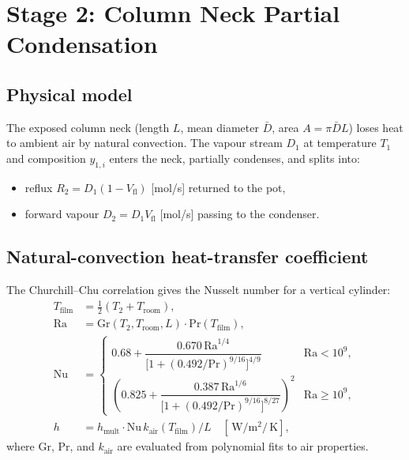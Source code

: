 \documentclass[11pt,letterpaper]{article}
\newcommand{\W}{\,\text{W}}
\newcommand{\K}{\,\text{K}}
\begin{document}
\section{Stage 2: Column Neck Partial Condensation}
\label{sec:stage2}

\subsection{Physical model}

The exposed column neck (length $L$, mean diameter $\bar{D}$, area $A = \pi \bar{D} L$)
loses heat to ambient air by natural convection.  The vapour stream $D_1$ at
temperature $T_1$ and composition $y_{1,i}$ enters the neck, partially
condenses, and splits into:
\begin{itemize}[nosep]
  \item reflux $R_2 = D_1(1-V_{\mathrm{fl}})$ [mol/s] returned to the pot,
  \item forward vapour $D_2 = D_1 V_{\mathrm{fl}}$ [mol/s] passing to the condenser.
\end{itemize}

\subsection{Natural-convection heat-transfer coefficient}

The Churchill--Chu correlation gives the Nusselt number for a vertical cylinder:
\begin{align}
  T_{\mathrm{film}} &= \tfrac{1}{2}(T_2 + T_{\mathrm{room}}),\\
  \mathrm{Ra} &= \mathrm{Gr}(T_2, T_{\mathrm{room}}, L) \cdot \mathrm{Pr}(T_{\mathrm{film}}),\\
  \mathrm{Nu} &= \begin{cases}
    0.68 + \dfrac{0.670\,\mathrm{Ra}^{1/4}}{\bigl[1+(0.492/\mathrm{Pr})^{9/16}\bigr]^{4/9}}
    & \mathrm{Ra} < 10^9,\\[8pt]
    \left(0.825 + \dfrac{0.387\,\mathrm{Ra}^{1/6}}{\bigl[1+(0.492/\mathrm{Pr})^{9/16}\bigr]^{8/27}}\right)^{\!2}
    & \mathrm{Ra} \ge 10^9,
  \end{cases}\\
  h &= h_{\mathrm{mult}} \cdot \mathrm{Nu}\, k_{\mathrm{air}}(T_{\mathrm{film}}) / L \quad [\W/\mathrm{m}^2/\K],
\end{align}
where $\mathrm{Gr}$, $\mathrm{Pr}$, and $k_{\mathrm{air}}$ are evaluated from
polynomial fits to air properties.
\end{document}
